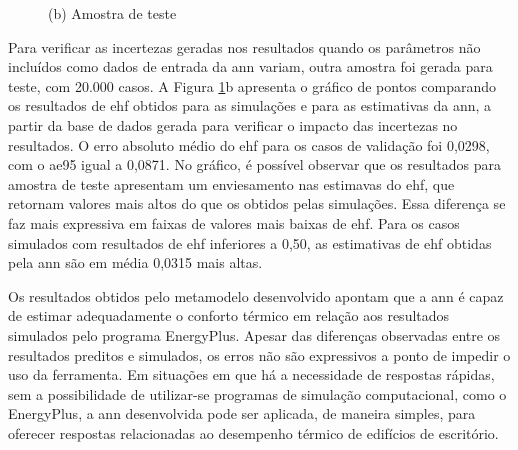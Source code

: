 \documentclass[brazil,hardcopy,openany]{ufscthesis} %
\begin{document}
\begin{figure}[h]
\begin{minipage}{.5\textwidth}
		\begin{center}
			\small{(b) Amostra de teste}
		\end{center}
	\end{minipage}
	\label{fig:ann_validation}
\end{figure}


Para verificar as incertezas geradas nos resultados quando os parâmetros não incluídos como dados de entrada da \acrshort{ann} variam, outra amostra foi gerada para teste, com 20.000 casos.
A Figura \ref{fig:ann_validation}b apresenta o gráfico de pontos comparando os resultados de \acrshort{ehf} obtidos para as simulações e para as estimativas da \acrshort{ann}, a partir da base de dados gerada para verificar o impacto das incertezas no resultados. O erro absoluto médio do \acrshort{ehf} para os casos de validação foi 0,0298, com o \acrshort{ae95} igual a 0,0871.
No gráfico, é possível observar que os resultados para amostra de teste apresentam um enviesamento nas estimavas do \acrshort{ehf}, que retornam valores mais altos do que os obtidos pelas simulações. Essa diferença se faz mais expressiva em faixas de valores mais baixas de \acrshort{ehf}. Para os casos simulados com resultados de \acrshort{ehf} inferiores a 0,50, as estimativas de \acrshort{ehf} obtidas pela \acrshort{ann} são em média 0,0315 mais altas.

Os resultados obtidos pelo metamodelo desenvolvido apontam que a \acrshort{ann} é capaz de estimar adequadamente o conforto térmico em relação aos resultados simulados pelo programa EnergyPlus. 
Apesar das diferenças observadas entre os resultados preditos e simulados, os erros não são expressivos a ponto de impedir o uso da ferramenta.
Em situações em que há a necessidade de respostas rápidas, sem a possibilidade de utilizar-se programas de simulação computacional, como o EnergyPlus, a \acrshort{ann} desenvolvida pode ser aplicada, de maneira simples, para oferecer respostas relacionadas ao desempenho térmico de edifícios de escritório.

\end{document}
